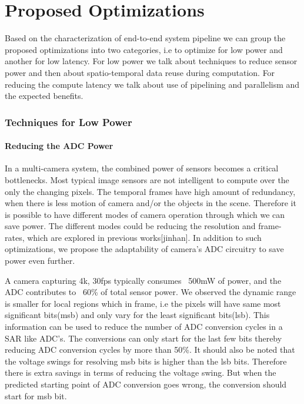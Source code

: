 \chapter{Proposed Optimizations}

Based on the characterization of end-to-end system pipeline we can group the proposed optimizations into two categories, i.e to optimize for low power and another for low latency. For low power we talk about techniques to reduce sensor power and then about spatio-temporal data reuse during computation. For reducing the compute latency we talk about use of pipelining and parallelism and the expected benefits. 

\subsection{Techniques for Low Power}

\subsubsection{Reducing the ADC Power}
In a multi-camera system, the combined power of sensors becomes a critical bottlenecks. Most typical image sensors are not intelligent to compute over the only the changing pixels. The temporal frames have high amount of redundancy, when there is less motion of camera and/or the objects in the scene. Therefore it is possible to have different modes of camera operation through which we can save power. The different modes could be reducing the resolution and frame-rates, which are explored in previous works[jinhan]. In addition to such optimizations, we propose the adaptability of camera's ADC circuitry to save power even further. 

A camera capturing 4k, 30fps typically consumes ~500mW of power, and the ADC contributes to ~60\% of total sensor power. We observed the dynamic range is smaller for local regions which in frame, i.e the pixels will have same most significant bits(msb) and only vary for the least significant bits(lsb). This information can be used to reduce the number of ADC conversion cycles in a SAR like ADC's. The conversions can only start for the last few bits thereby reducing ADC conversion cycles by more than 50\%. It should also be noted that the voltage swings for resolving msb bits is higher than the lsb bits. Therefore there is extra savings in terms of reducing the voltage swing. But when the predicted starting point of ADC conversion goes wrong, the conversion should start for msb bit. 

